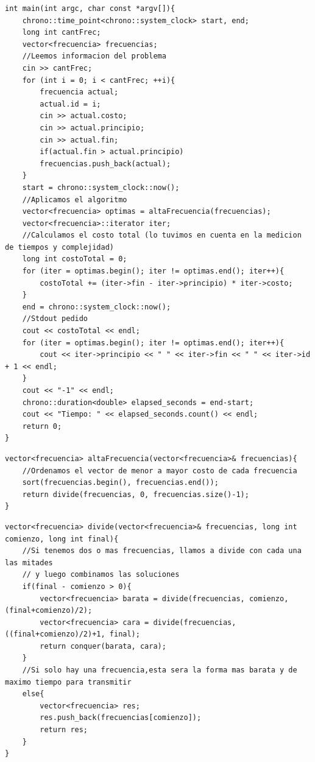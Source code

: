 		\begin{codesnippet}
	\begin{verbatim}
int main(int argc, char const *argv[]){
    chrono::time_point<chrono::system_clock> start, end;
    long int cantFrec;
    vector<frecuencia> frecuencias;
    //Leemos informacion del problema
    cin >> cantFrec;
    for (int i = 0; i < cantFrec; ++i){
        frecuencia actual;
        actual.id = i;
        cin >> actual.costo;
        cin >> actual.principio;
        cin >> actual.fin;
        if(actual.fin > actual.principio)
        frecuencias.push_back(actual);
    }
    start = chrono::system_clock::now();
    //Aplicamos el algoritmo
    vector<frecuencia> optimas = altaFrecuencia(frecuencias);
    vector<frecuencia>::iterator iter;
    //Calculamos el costo total (lo tuvimos en cuenta en la medicion de tiempos y complejidad)
    long int costoTotal = 0;
    for (iter = optimas.begin(); iter != optimas.end(); iter++){
        costoTotal += (iter->fin - iter->principio) * iter->costo;
    }
    end = chrono::system_clock::now();
    //Stdout pedido
    cout << costoTotal << endl;
    for (iter = optimas.begin(); iter != optimas.end(); iter++){
        cout << iter->principio << " " << iter->fin << " " << iter->id + 1 << endl;
    }
    cout << "-1" << endl;
    chrono::duration<double> elapsed_seconds = end-start;
    cout << "Tiempo: " << elapsed_seconds.count() << endl;
    return 0;
}
	\end{verbatim}
	\end{codesnippet}
	
	
		\begin{codesnippet}
	\begin{verbatim}
vector<frecuencia> altaFrecuencia(vector<frecuencia>& frecuencias){
    //Ordenamos el vector de menor a mayor costo de cada frecuencia
    sort(frecuencias.begin(), frecuencias.end());
    return divide(frecuencias, 0, frecuencias.size()-1);
}
	\end{verbatim}
	\end{codesnippet}

	
		\begin{codesnippet}
	\begin{verbatim}
vector<frecuencia> divide(vector<frecuencia>& frecuencias, long int comienzo, long int final){
    //Si tenemos dos o mas frecuencias, llamos a divide con cada una las mitades
    // y luego combinamos las soluciones
    if(final - comienzo > 0){
        vector<frecuencia> barata = divide(frecuencias, comienzo, (final+comienzo)/2);
        vector<frecuencia> cara = divide(frecuencias, ((final+comienzo)/2)+1, final);
        return conquer(barata, cara);
    }
    //Si solo hay una frecuencia,esta sera la forma mas barata y de maximo tiempo para transmitir
    else{
        vector<frecuencia> res;
        res.push_back(frecuencias[comienzo]);
        return res;
    }
}
	\end{verbatim}
	\end{codesnippet}
	
